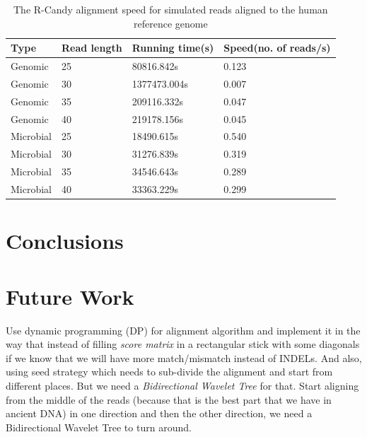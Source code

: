 \documentclass[11pt,a4paper]{report}
\begin{document}
\begin{table}[h]
  \begin{tabular}{ |  p{2cm} | p{2cm} | p{3cm} | p{3cm} | }
    \hline
  	\textbf{Type} & \textbf{Read length } &\textbf{Running time(s) } &\textbf
     {Speed\hspace{35pt}(no. of reads/s)} \\ \hline 
  
      Genomic   & 25  & 80816.842s   & 0.123 \\ \hline
      Genomic   & 30  & 1377473.004s & 0.007 \\ \hline
 	  Genomic	& 35  & 209116.332s  & 0.047 \\ \hline
 	  Genomic	& 40  & 219178.156s  & 0.045 \\ \hline
 	  Microbial & 25  & 18490.615s   & 0.540 \\ \hline
      Microbial & 30  & 31276.839s   & 0.319 \\ \hline
 	  Microbial & 35  & 34546.643s   & 0.289 \\ \hline
 	  Microbial & 40  & 33363.229s   & 0.299 \\ \hline
 	  
   \end{tabular}
\caption{The R-Candy alignment speed for simulated reads aligned to the human reference genome}
\label{speed-RG}
\end{table}




\section{Conclusions}


\section{Future Work}
Use dynamic programming (DP) for alignment algorithm and implement it in the way that instead of filling 
\emph{score matrix} in a rectangular stick with some diagonals if we know that we will have more match/mismatch instead of INDELs.
And also, using seed strategy which needs to sub-divide the alignment and start from different places.
But we need a \emph{Bidirectional Wavelet Tree}\cite{bidirectional} for that. Start aligning from the middle 
of the reads (because that is the best part that we have in ancient DNA) in one direction and then the other direction, 
we need a Bidirectional Wavelet Tree to turn around.
\end{document}
